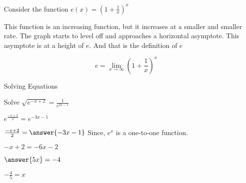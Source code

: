 \documentclass{ximera}
\begin{document}
Consider the function $e(x) = \left(1 + \frac{1}{x}\right)^x$



\begin{center}
\end{center}


This function is an increasing function, but it increases at a smaller and smaller rate.  The graph starts to level off and approaches a horizontal asymptote.  This asymptote is at a height of $e$.  And that is the definition of $e$


\[   e = \lim_{x \to \infty}  \left(1 + \frac{1}{x}\right)^x      \]


















\begin{example} Solving Equations


Solve $\sqrt{e^{-x + 2}} = \frac{1}{e^{3x-1}}$




$e^{\tfrac{-x + 2}{2}}= e^{-3x-1}$


$\frac{-x + 2}{2} = \answer{-3x-1}$    Since, $e^x$ is a one-to-one function.

$-x + 2 = -6x - 2$

$\answer{5x} = -4$


$-\frac{4}{5} = x$

\end{example}
\end{document}
